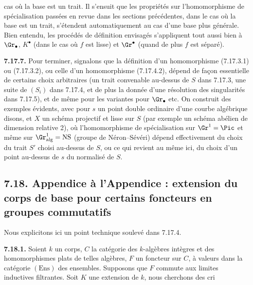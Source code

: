 
cas où la base est un trait. Il s'ensuit que les propriétés sur l'homomorphisme de spécialisation passées en revue dans les sections précédentes, dans le cas où la base est un trait, s'étendent automatiquement au cas d'une base plus générale. Bien entendu, les procédés de définition envisagés s'appliquent tout aussi bien à \(\Gr_\bullet\), \(K^\bullet\) (dans le cas où \(f\) est lisse) et \(\Gr^\bullet\) (quand de plus \(f\) est séparé).

\textbf{7.17.7.} Pour terminer, signalons que la définition d'un homomorphisme (7.17.3.1) ou (7.17.3.2), ou celle d'un homomorphisme (7.17.4.2), dépend de façon essentielle de certains choix arbitraires (un trait convenable au-dessus de \(S\) dans 7.17.3, une suite de \((S_i)\) dans 7.17.4, et de plus la donnée d'une résolution des singularités dans 7.17.5), et de même pour les variantes pour \(\Gr_\bullet\) etc. On construit des exemples évidents, avec pour \(s\) un point double ordinaire d'une courbe algébrique disons, et \(X\) un schéma projectif et lisse sur \(S\) (par exemple un schéma abélien de dimension relative 2), où l'homomorphisme de spécialisation sur \(\Gr^1=\Pic\) et même sur \(\Gr^1_{\mathrm{alg}}=\mathrm{NS}\) (groupe de Néron--Sévéri) dépend effectivement du choix du trait \(S'\) choisi au-dessus de \(S\), ou ce qui revient au même ici, du choix d'un point au-dessus de \(s\) du normalisé de \(S\).

\subsection*{7.18. Appendice à l'Appendice : extension du corps de base pour certains foncteurs en groupes commutatifs}
Nous explicitons ici un point technique soulevé dans 7.17.4.

\textbf{7.18.1.} Soient \(k\) un corps, \(C\) la catégorie des \(k\)-algèbres intègres et des homomorphismes plats de telles algèbres, \(F\) un foncteur sur \(C\), à valeurs dans la catégorie \((\mathrm{Ens})\) des ensembles. Supposons que \(F\) commute aux limites inductives filtrantes. Soit \(K\) une extension de \(k\), nous cherchons des cri%
